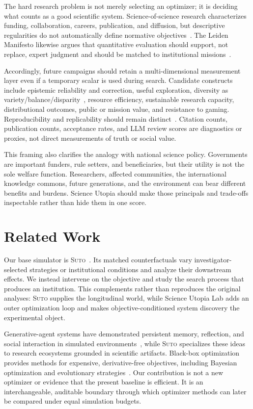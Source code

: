 \documentclass{article}
\newcommand{\suto}{\textsc{Suto}}
\begin{document}
The hard research problem is not merely selecting an optimizer; it is deciding what counts as a good scientific system. Science-of-science research characterizes funding, collaboration, careers, publication, and diffusion, but descriptive regularities do not automatically define normative objectives~\citep{fortunato2018science}. The Leiden Manifesto likewise argues that quantitative evaluation should support, not replace, expert judgment and should be matched to institutional missions~\citep{hicks2015leiden}.

Accordingly, future campaigns should retain a multi-dimensional measurement layer even if a temporary scalar is used during search. Candidate constructs include epistemic reliability and correction, useful exploration, diversity as variety/balance/disparity~\citep{stirling2007general}, resource efficiency, sustainable research capacity, distributional outcomes, public or mission value, and resistance to gaming. Reproducibility and replicability should remain distinct~\citep{nasem2019reproducibility}. Citation counts, publication counts, acceptance rates, and LLM review scores are diagnostics or proxies, not direct measurements of truth or social value.

This framing also clarifies the analogy with national science policy. Governments are important funders, rule setters, and beneficiaries, but their utility is not the sole welfare function. Researchers, affected communities, the international knowledge commons, future generations, and the environment can bear different benefits and burdens. Science Utopia should make those principals and trade-offs inspectable rather than hide them in one score.

\section{Related Work}

Our base simulator is \suto{}~\citep{jin2026scienceutopia}. Its matched counterfactuals vary investigator-selected strategies or institutional conditions and analyze their downstream effects. We instead intervene on the objective and study the search process that produces an institution. This complements rather than reproduces the original analyses: \suto{} supplies the longitudinal world, while Science Utopia Lab adds an outer optimization loop and makes objective-conditioned system discovery the experimental object.

Generative-agent systems have demonstrated persistent memory, reflection, and social interaction in simulated environments~\citep{park2023generative}, while \suto{} specializes these ideas to research ecosystems grounded in scientific artifacts. Black-box optimization provides methods for expensive, derivative-free objectives, including Bayesian optimization and evolutionary strategies~\citep{shahriari2016taking}. Our contribution is not a new optimizer or evidence that the present baseline is efficient. It is an interchangeable, auditable boundary through which optimizer methods can later be compared under equal simulation budgets.
\end{document}
